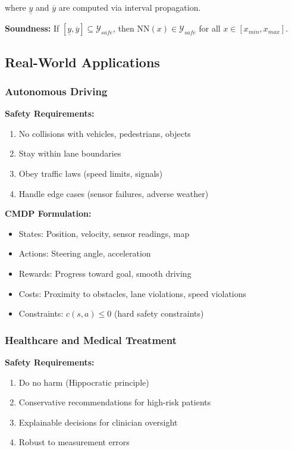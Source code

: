 \documentclass[12pt]{article}
\begin{document}
{{{{where $\underline{y}$ and $\overline{y}$ are computed via interval propagation.

\textbf{Soundness:} If $[\underline{y}, \overline{y}] \subseteq \mathcal{Y}_{safe}$, then $\text{NN}(x) \in \mathcal{Y}_{safe}$ for all $x \in [x_{min}, x_{max}]$.

\subsection{Real-World Applications}

\subsubsection{Autonomous Driving}

\textbf{Safety Requirements:}
\begin{enumerate}
\item No collisions with vehicles, pedestrians, objects
\item Stay within lane boundaries
\item Obey traffic laws (speed limits, signals)
\item Handle edge cases (sensor failures, adverse weather)
\end{enumerate}

\textbf{CMDP Formulation:}
\begin{itemize}
\item States: Position, velocity, sensor readings, map
\item Actions: Steering angle, acceleration
\item Rewards: Progress toward goal, smooth driving
\item Costs: Proximity to obstacles, lane violations, speed violations
\item Constraints: $c(s,a) \leq 0$ (hard safety constraints)
\end{itemize}

\subsubsection{Healthcare and Medical Treatment}

\textbf{Safety Requirements:}
\begin{enumerate}
\item Do no harm (Hippocratic principle)
\item Conservative recommendations for high-risk patients
\item Explainable decisions for clinician oversight
\item Robust to measurement errors
\end{enumerate}

}}}}
\end{document}
